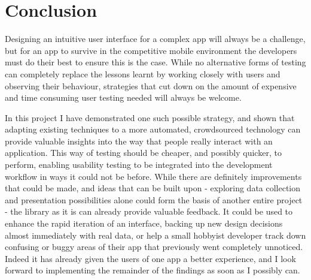\chapter{Conclusion}

Designing an intuitive user interface for a complex app will always be a
challenge, but for an app to survive in the competitive mobile
environment the developers must do their best to ensure this is the case.
While no alternative forms of testing can completely replace the lessons learnt
by working closely with users and observing their behaviour, strategies that
cut down on the amount of expensive and time consuming user testing needed
will always be welcome.

In this project I have demonstrated one such possible strategy, and shown 
that adapting existing techniques to a more automated, crowdsourced technology
can provide valuable insights into the way that people really interact with
an application. This way of testing should be cheaper, and possibly quicker, 
to perform, enabling usability testing to be integrated into the development
workflow in ways it could not be before. While there are definitely improvements that could be made,
and ideas that can be built upon - exploring data collection and presentation
possibilities alone could form the basis of another entire project - the library
as it is can already provide valuable feedback.
It could be used to enhance the rapid iteration of an interface, backing up new design decisions
almost immediately with real data, or help a small hobbyist developer
track down confusing or buggy areas of their app that previously went
completely unnoticed. Indeed it has already given the users of one app
a better experience, and I look forward to implementing the remainder
of the findings as soon as I possibly can.